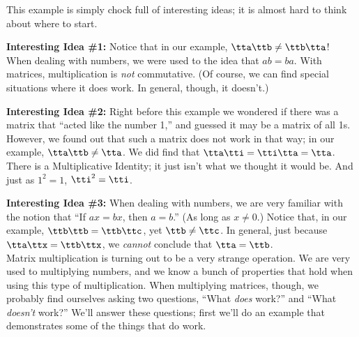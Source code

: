 \medskip

This example is simply chock full of interesting ideas; it is almost hard to think about where to start. 

\textsf{\textbf{Interesting Idea \#1:}} Notice that in our example, $\tta\ttb \neq \ttb\tta$! When dealing with numbers, we were used to the idea that $ab = ba$. With matrices, multiplication is \textit{not} commutative. (Of course, we can find special situations where it does work. In general, though, it doesn't.)

\textsf{\textbf{Interesting Idea \#2:}} Right before this example we wondered if there was a matrix that ``acted like the number 1,'' and guessed it may be a matrix of all 1s. %
However, we found out that such a matrix does not work in that way; in our example, $\tta\ttb \neq \tta$. We did find that $\tta\tti = \tti\tta = \tta$. There is a Multiplicative Identity; it just isn't what we thought it would be. And just as $1^2 = 1$, $\tti^2 = \tti$.

\textsf{\textbf{Interesting Idea \#3:}} When dealing with numbers, we are very familiar with the notion that ``If $ax = bx$, then $a=b$.'' (As long as $x\neq 0$.) Notice that, in our example, $\ttb\ttb = \ttb\ttc$, yet $\ttb\neq\ttc$. In general, just because $\tta\ttx = \ttb\ttx$, we \textit{cannot} conclude that $\tta =\ttb$.\\

Matrix multiplication is turning out to be a very strange operation. We are very used to multiplying numbers, and we know a bunch of properties that hold when using this type of multiplication. When multiplying matrices, though, we probably find ourselves asking two questions, ``What \textit{does} work?'' and ``What \textit{doesn't} work?'' We'll answer these questions; first we'll do an example that demonstrates some of the things that do work.

\medskip

